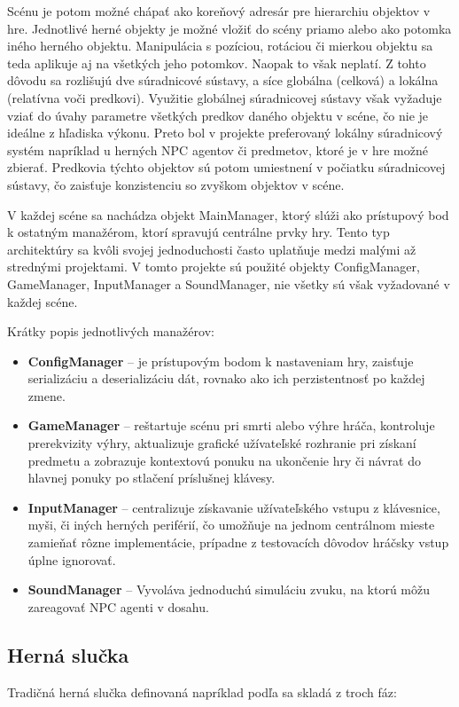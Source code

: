 \documentclass[slovak, master]{diploma}
\begin{document}
Scénu je potom možné chápať ako koreňový adresár pre hierarchiu objektov v hre. Jednotlivé herné objekty je možné vložiť do scény priamo alebo ako potomka iného herného objektu. Manipulácia s pozíciou, rotáciou či mierkou objektu sa teda aplikuje aj na všetkých jeho potomkov. Naopak to však neplatí. Z tohto dôvodu sa rozlišujú dve súradnicové sústavy, a síce globálna (celková) a lokálna (relatívna voči predkovi). Využitie globálnej súradnicovej sústavy však vyžaduje vziať do úvahy parametre všetkých predkov daného objektu v scéne, čo nie je ideálne z hľadiska výkonu. Preto bol v projekte preferovaný lokálny súradnicový systém napríklad u herných NPC agentov či predmetov, ktoré je v hre možné zbierať. Predkovia týchto objektov sú potom umiestnení v počiatku súradnicovej sústavy, čo zaisťuje konzistenciu so zvyškom objektov v scéne.

V každej scéne sa nachádza objekt MainManager, ktorý slúži ako prístupový bod k ostatným manažérom, ktorí spravujú centrálne prvky hry. Tento typ architektúry sa kvôli svojej jednoduchosti často uplatňuje medzi malými až strednými projektami. V tomto projekte sú použité objekty ConfigManager, GameManager, InputManager a SoundManager, nie všetky sú však vyžadované v každej scéne. 

Krátky popis jednotlivých manažérov:
\begin{itemize}
  \item \textbf{ConfigManager} -- je prístupovým bodom k nastaveniam hry, zaisťuje serializáciu a deserializáciu dát, rovnako ako ich perzistentnosť po každej zmene.
  \item \textbf{GameManager} -- reštartuje scénu pri smrti alebo výhre hráča, kontroluje prerekvizity výhry, aktualizuje grafické užívateľské rozhranie pri získaní predmetu a zobrazuje kontextovú ponuku na ukončenie hry či návrat do hlavnej ponuky po stlačení príslušnej klávesy.
  \item \textbf{InputManager} -- centralizuje získavanie užívateľského vstupu z klávesnice, myši, či iných herných periférií, čo umožňuje na jednom centrálnom mieste zamieňať rôzne implementácie, prípadne z testovacích dôvodov hráčsky vstup úplne ignorovať. 
  \item \textbf{SoundManager} -- Vyvoláva jednoduchú simuláciu zvuku, na ktorú môžu zareagovať NPC agenti v dosahu.
\end{itemize}

\subsection{Herná slučka}
\label{sec:GameLoop}
Tradičná herná slučka definovaná napríklad podľa \cite{GameAlgorithms} sa skladá z troch fáz:
\end{document}
